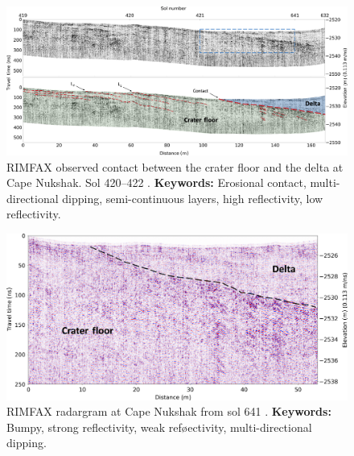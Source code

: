 \begin{figure}[h!]
    \centering
    \includegraphics[width=0.9\linewidth]{Figures/0.5RIMFAX/Paige_2024-f4.jpg}
    \caption[RIMFAX observed contact between the crater floor and the delta at Cape Nukshak. Sol 420–422]{RIMFAX observed contact between the crater floor and the delta at Cape Nukshak. Sol 420–422 \citep{Paige2024}.\textbf{ Keywords:} Erosional contact, multi-directional dipping, semi-continuous layers, high reflectivity, low reflectivity.}
    \label{fig:Paige24-4}
\end{figure}

\begin{figure}[h!]
    \centering
    \includegraphics[width=0.9\linewidth]{Figures/0.5RIMFAX/Paige_2024-f5.jpg}
    \caption[RIMFAX radargram from sol 641]{RIMFAX radargram at Cape Nukshak from sol 641 \citep{Paige2024}. \textbf{Keywords:} Bumpy, strong reflectivity, weak reføectivity, multi-directional dipping.}
    \label{fig:Paige24-5}
\end{figure}

